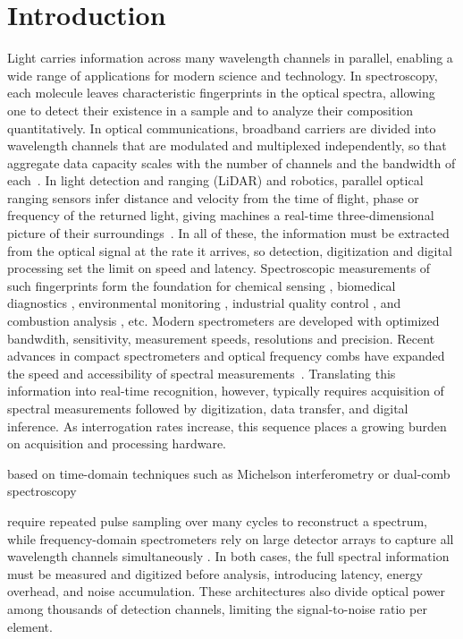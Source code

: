 \documentclass[11pt]{article}
\begin{document}
\section{Introduction}
Light carries information across many wavelength channels in parallel, enabling a wide range of applications for modern science and technology. In spectroscopy, each molecule leaves characteristic fingerprints in the optical spectra, allowing one to detect their existence in a sample and to analyze their composition quantitatively. In optical communications, broadband carriers are divided into wavelength channels that are modulated and multiplexed independently, so that aggregate data capacity scales with the number of channels and the bandwidth of each~\cite{corcoran2020,jorgensen2022}. In light detection and ranging (LiDAR) and robotics, parallel optical ranging sensors infer distance and velocity from the time of flight, phase or frequency of the returned light, giving machines a real-time three-dimensional picture of their surroundings~\cite{riemensberger2020,rogers2021}. In all of these, the information must be extracted from the optical signal at the rate it arrives, so detection, digitization and digital processing set the limit on speed and latency. Spectroscopic measurements of such fingerprints form the foundation for chemical sensing \cite{Mansha2018, Chen2020, Khan2020}, biomedical diagnostics \cite{Confield2021, Cameron2022, Mantsch2021}, environmental monitoring \cite{Sharma2023, Han2024, rieker2014}, industrial quality control \cite{Zhang2025, Fodor2024, Esposito2024}, and combustion analysis \cite{long2024, Huang2025, Chen2021}, etc. Modern spectrometers are developed with optimized bandwdith, sensitivity, measurement speeds, resolutions and precision. Recent advances in compact spectrometers and optical frequency combs have expanded the speed and accessibility of spectral measurements~\cite{yang2021,picque2019,rieker2014}. Translating this information into real-time recognition, however, typically requires acquisition of spectral measurements followed by digitization, data transfer, and digital inference. As interrogation rates increase, this sequence places a growing burden on acquisition and processing hardware.


based on time-domain techniques such as Michelson interferometry \cite{Savage2009, yang2021} or dual-comb spectroscopy \cite{picque2019, coddington2016} 

require repeated pulse sampling over many cycles to reconstruct a spectrum, while frequency-domain spectrometers rely on large detector arrays to capture all wavelength channels simultaneously \cite{yang2021, Li2022}. In both cases, the full spectral information must be measured and digitized before analysis, introducing latency, energy overhead, and noise accumulation. These architectures also divide optical power among thousands of detection channels, limiting the signal-to-noise ratio per element. 
\end{document}
